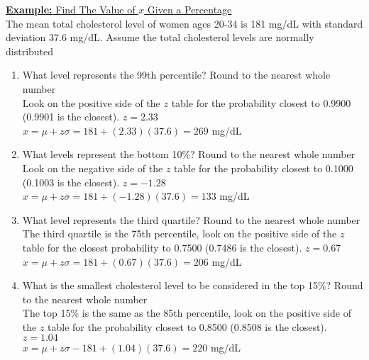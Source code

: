 \documentclass[a4paper]{article}
\let\bf\textbf
\begin{document}
\begin{shaded}
    \underline{\bf{Example:} Find The Value of $x$ Given a Percentage}
    \vspace{2mm}\\
    The mean total cholesterol level of women ages 20-34 is 181 mg/dL with standard deviation 37.6 mg/dL. Assume the total cholesterol levels are normally distributed
    \begin{enumerate}
        \item What level represents the 99th percentile? Round to the nearest whole number
        \vspace{1mm}\\
        Look on the positive side of the $z$ table for the probability closest to 0.9900 (0.9901 is the closest). $z = 2.33$\\
        $x = \mu + z\sigma = 181 + (2.33)(37.6) = 269$ mg/dL
        \item What levels represent the bottom 10\%? Round to the nearest whole number
        \vspace{1mm}\\
        Look on the negative side of the $z$ table for the probability closest to 0.1000 (0.1003 is the closest). $z = -1.28$\\
        $x = \mu + z\sigma = 181 + (-1.28)(37.6) = 133$ mg/dL
        \item What level represents the third quartile? Round to the nearest whole number
        \vspace{1mm}\\
        The third quartile is the 75th percentile, look on the positive side of the $z$ table for the closest probability to 0.7500 (0.7486 is the closest). $z = 0.67$\\
        $x = \mu + z\sigma = 181 + (0.67)(37.6) = 206$ mg/dL
        \item What is the smallest cholesterol level to be considered in the top 15\%? Round to the nearest whole number
        \vspace{1mm}\\
        The top 15\% is the same as the 85th percentile, look on the positive side of the $z$ table for the probability closest to 0.8500 (0.8508 is the closest). $z = 1.04$\\
        $x = \mu + z\sigma - 181 + (1.04)(37.6) = 220$ mg/dL
    \end{enumerate}
\end{shaded}
\end{document}

